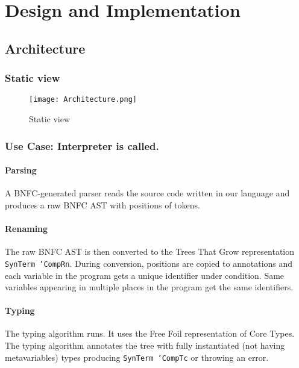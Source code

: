 \chapter{Design and Implementation}
\label{chap:DesignImplementation}

\section{Architecture}

\subsection{Static view}

\newpage

\begin{figure}[h]
    \centering
    \texttt{[image: Architecture.png]}
    \caption{Static view}
    \label{Architecture}
\end{figure}

\newpage

\subsection{Use Case: Interpreter is called.}

\subsubsection{Parsing}

A BNFC-generated parser reads the source code written in our language and produces a raw BNFC AST with positions of tokens.

\subsubsection{Renaming}

The raw BNFC AST is then converted to the Trees That Grow representation \texttt{SynTerm 'CompRn}.
During conversion, positions are copied to annotations and each variable in the program gets a unique identifier under condition.
Same variables appearing in multiple places in the program get the same identifiers.

\subsubsection{Typing}

The typing algorithm runs.
It uses the Free Foil representation of Core Types.
The typing algorithm annotates the tree with fully instantiated (not having metavariables) types producing \texttt{SynTerm 'CompTc} or throwing an error.

